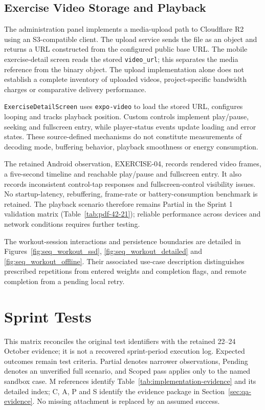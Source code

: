 \documentclass[12pt,a4paper,openany]{report}
\begin{document}
\subsection{Exercise Video Storage and Playback}

The administration panel implements a media-upload path to Cloudflare R2 using an S3-compatible client. The upload service sends the file as an object and returns a URL constructed from the configured public base URL. The mobile exercise-detail screen reads the stored \texttt{video\_url}; this separates the media reference from the binary object. The upload implementation alone does not establish a complete inventory of uploaded videos, project-specific bandwidth charges or comparative delivery performance.


\texttt{ExerciseDetailScreen} uses \texttt{expo-video} to load the stored URL, configures looping and tracks playback position. Custom controls implement play/pause, seeking and fullscreen entry, while player-status events update loading and error states. These source-defined mechanisms do not constitute measurements of decoding mode, buffering behavior, playback smoothness or energy consumption.

The retained Android observation, EXERCISE-04, records rendered video frames, a five-second timeline and reachable play/pause and fullscreen entry. It also records inconsistent control-tap responses and fullscreen-control visibility issues. No startup-latency, rebuffering, frame-rate or battery-consumption benchmark is retained. The playback scenario therefore remains Partial in the Sprint 1 validation matrix (Table~\ref{tab:pdf-42-21}); reliable performance across devices and network conditions requires further testing.


The workout-session interactions and persistence boundaries are detailed in Figures~\ref{fig:seq_workout_ssd}, \ref{fig:seq_workout_detailed} and \ref{fig:seq_workout_offline}. Their associated use-case description distinguishes prescribed repetitions from entered weights and completion flags, and remote completion from a pending local retry.

\section{Sprint Tests}

This matrix reconciles the original test identifiers with the retained 22--24 October evidence; it is not a recovered sprint-period execution log. Expected outcomes remain test criteria. Partial denotes narrower observations, Pending denotes an unverified full scenario, and Scoped pass applies only to the named sandbox case. M references identify Table~\ref{tab:implementation-evidence} and its detailed index; C, A, P and S identify the evidence package in Section~\ref{sec:qa-evidence}. No missing attachment is replaced by an assumed success.
\end{document}
